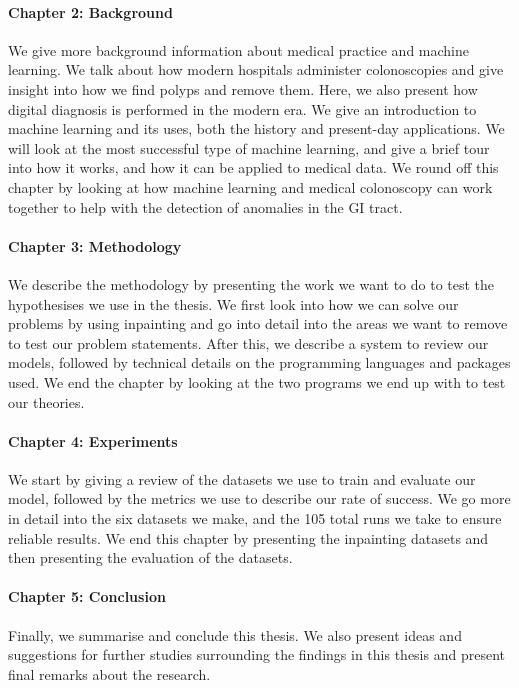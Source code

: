 \paragraph{Chapter 2: Background}
We give more background information about medical practice and machine learning.
We talk about how modern hospitals administer colonoscopies and give insight into how we find polyps and remove them. Here, we also present how digital diagnosis is performed in the modern era.  
We give an introduction to machine learning and its uses, both the history and present-day applications. We will look at the most successful type of machine learning, and give a brief tour into how it works, and how it can be applied to medical data.
We round off this chapter by looking at how machine learning and medical colonoscopy can work together to help with the detection of anomalies in the GI tract.

\paragraph{Chapter 3: Methodology }
We describe the methodology by presenting the work we want to do to test the hypothesises we use in the thesis.
We first look into how we can solve our problems by using inpainting and go into detail into the areas we want to remove to test our problem statements. 
After this, we describe a system to review our models, followed by technical details on the programming languages and packages used.
We end the chapter by looking at the two programs we end up with to test our theories. 


\paragraph{Chapter 4: Experiments}
We start by giving a review of the datasets we use to train and evaluate our model, followed by the metrics we use to describe our rate of success.
We go more in detail into the six datasets we make, and the 105 total runs we take to ensure reliable results.
We end this chapter by presenting the inpainting datasets and then presenting the evaluation of the datasets.


\paragraph{Chapter 5: Conclusion}
Finally, we summarise and conclude this thesis.
We also present ideas and suggestions for further studies surrounding
the findings in this thesis and present final remarks about the research.

